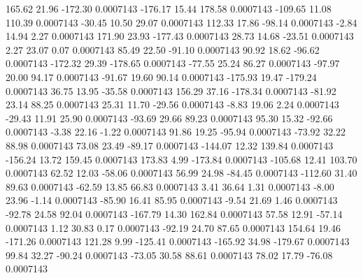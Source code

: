       165.62       21.96     -172.30     0.0007143
     -176.17       15.44      178.58     0.0007143
     -109.65       11.08      110.39     0.0007143
      -30.45       10.50       29.07     0.0007143
      112.33       17.86      -98.14     0.0007143
       -2.84       14.94        2.27     0.0007143
      171.90       23.93     -177.43     0.0007143
       28.73       14.68      -23.51     0.0007143
        2.27       23.07        0.07     0.0007143
       85.49       22.50      -91.10     0.0007143
       90.92       18.62      -96.62     0.0007143
     -172.32       29.39     -178.65     0.0007143
      -77.55       25.24       86.27     0.0007143
      -97.97       20.00       94.17     0.0007143
      -91.67       19.60       90.14     0.0007143
     -175.93       19.47     -179.24     0.0007143
       36.75       13.95      -35.58     0.0007143
      156.29       37.16     -178.34     0.0007143
      -81.92       23.14       88.25     0.0007143
       25.31       11.70      -29.56     0.0007143
       -8.83       19.06        2.24     0.0007143
      -29.43       11.91       25.90     0.0007143
      -93.69       29.66       89.23     0.0007143
       95.30       15.32      -92.66     0.0007143
       -3.38       22.16       -1.22     0.0007143
       91.86       19.25      -95.94     0.0007143
      -73.92       32.22       88.98     0.0007143
       73.08       23.49      -89.17     0.0007143
     -144.07       12.32      139.84     0.0007143
     -156.24       13.72      159.45     0.0007143
      173.83        4.99     -173.84     0.0007143
     -105.68       12.41      103.70     0.0007143
       62.52       12.03      -58.06     0.0007143
       56.99       24.98      -84.45     0.0007143
     -112.60       31.40       89.63     0.0007143
      -62.59       13.85       66.83     0.0007143
        3.41       36.64        1.31     0.0007143
       -8.00       23.96       -1.14     0.0007143
      -85.90       16.41       85.95     0.0007143
       -9.54       21.69        1.46     0.0007143
      -92.78       24.58       92.04     0.0007143
     -167.79       14.30      162.84     0.0007143
       57.58       12.91      -57.14     0.0007143
        1.12       30.83        0.17     0.0007143
      -92.19       24.70       87.65     0.0007143
      154.64       19.46     -171.26     0.0007143
      121.28        9.99     -125.41     0.0007143
     -165.92       34.98     -179.67     0.0007143
       99.84       32.27      -90.24     0.0007143
      -73.05       30.58       88.61     0.0007143
       78.02       17.79      -76.08     0.0007143
